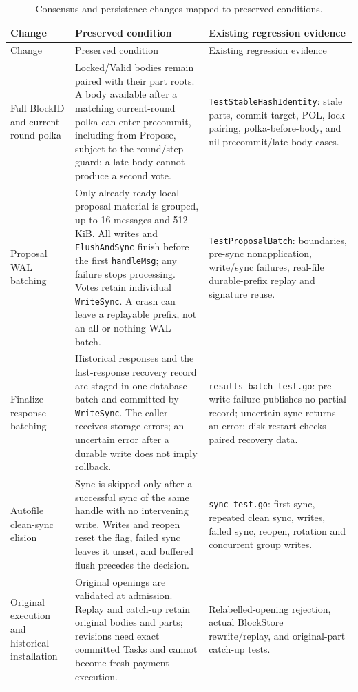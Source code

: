 \begin{longtable}{@{}p{}p{}p{}@{}}
\caption{Consensus and persistence changes mapped to preserved conditions.}\label{tab:supp-consensus-map}\\
\toprule
Change & Preserved condition & Existing regression evidence \\
\midrule\endfirsthead
\toprule Change & Preserved condition & Existing regression evidence \\
\midrule\endhead
Full BlockID and current-round polka &
Locked/Valid bodies remain paired with their part roots. A body available after a matching current-round polka can enter precommit, including from Propose, subject to the round/step guard; a late body cannot produce a second vote. &
\texttt{TestStableHashIdentity}: stale parts, commit target, POL, lock pairing, polka-before-body, and nil-precommit/late-body cases. \\
Proposal WAL batching &
Only already-ready local proposal material is grouped, up to 16 messages and 512\,KiB. All writes and \texttt{FlushAndSync} finish before the first \texttt{handleMsg}; any failure stops processing. Votes retain individual \texttt{WriteSync}. A crash can leave a replayable prefix, not an all-or-nothing WAL batch. &
\texttt{TestProposalBatch}: boundaries, pre-sync nonapplication, write/sync failures, real-file durable-prefix replay and signature reuse. \\
Finalize response batching &
Historical responses and the last-response recovery record are staged in one database batch and committed by \texttt{WriteSync}. The caller receives storage errors; an uncertain error after a durable write does not imply rollback. &
\texttt{results\_batch\_test.go}: pre-write failure publishes no partial record; uncertain sync returns an error; disk restart checks paired recovery data. \\
Autofile clean-sync elision &
Sync is skipped only after a successful sync of the same handle with no intervening write. Writes and reopen reset the flag, failed sync leaves it unset, and buffered flush precedes the decision. &
\texttt{sync\_test.go}: first sync, repeated clean sync, writes, failed sync, reopen, rotation and concurrent group writes. \\
Original execution and historical installation &
Original openings are validated at admission. Replay and catch-up retain original bodies and parts; revisions need exact committed Tasks and cannot become fresh payment execution. &
Relabelled-opening rejection, actual BlockStore rewrite/replay, and original-part catch-up tests. \\
\bottomrule
\end{longtable}

